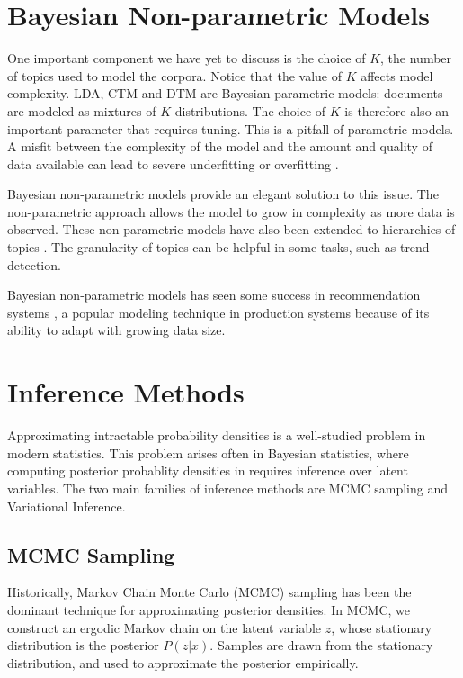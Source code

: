 \documentclass[letterpaper]{article}
\begin{document}
\section{Bayesian Non-parametric Models}
One important component we have yet to discuss is the choice of $K$,
the number of topics used to model the corpora. Notice that the value
of $K$ affects model complexity. LDA, CTM and DTM are Bayesian
parametric models: documents are modeled as mixtures of $K$
distributions. The choice of $K$ is therefore also an important
parameter that requires tuning. This is a pitfall of parametric
models. A misfit between the complexity of the model and the amount
and quality of data available can lead to severe underfitting or
overfitting \cite{teh2011dirichlet}.

Bayesian non-parametric models provide an elegant solution to this
issue. The non-parametric approach allows the model to grow in
complexity as more data is observed. These non-parametric models have
also been extended to hierarchies of topics \cite{blei2010nested}. The
granularity of topics can be helpful in some tasks, such as trend
detection.

Bayesian non-parametric models has seen some success in recommendation
systems \cite{gopalan2014bayesian}, a popular modeling technique in
production systems because of its ability to adapt with growing data
size.

\section{Inference Methods}
\label{sec:inference}
Approximating intractable probability densities is a well-studied
problem in modern statistics. This problem arises often in Bayesian
statistics, where computing posterior probablity densities in requires
inference over latent variables. The two main families of inference
methods are MCMC sampling and Variational Inference.

\subsection{MCMC Sampling}
\label{subsec:mcmc-sampling}
Historically, Markov Chain Monte Carlo (MCMC) sampling has been the
dominant technique for approximating posterior densities. In MCMC, we
construct an ergodic Markov chain on the latent variable $z$,
whose stationary distribution is the posterior $P( z | x)$.
Samples are drawn from the stationary distribution, and used to
approximate the posterior empirically.
\end{document}
